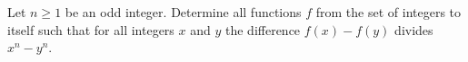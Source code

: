 Let $n \geq 1$ be an odd integer. Determine all functions $f$ from the set of integers to itself such that for all integers $x$ and $y$ the difference $f(x) - f(y)$ divides $x^{n} - y^{n}$.
